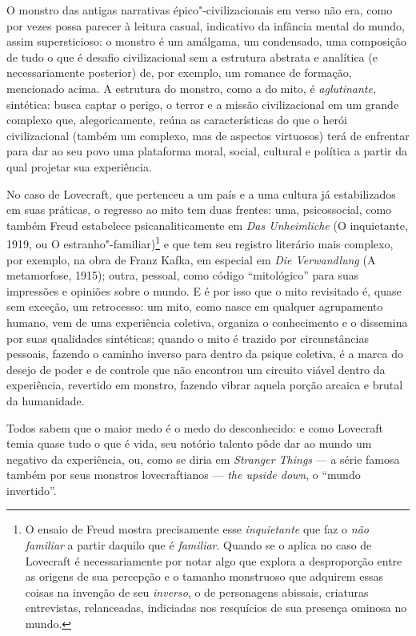 O monstro das antigas narrativas épico"-civilizacionais em verso não era,
como por vezes possa parecer à leitura casual, indicativo da infância
mental do mundo, assim supersticioso: o monstro é um amálgama, um
condensado, uma composição de tudo o que é desafio civilizacional sem a
estrutura abstrata e analítica (e necessariamente posterior) de, por
exemplo, um romance de formação, mencionado acima. A estrutura do
monstro, como a do mito, é \emph{aglutinante,} sintética: busca captar o
perigo, o terror e a missão civilizacional em um grande complexo que,
alegoricamente, reúna as características do que o herói civilizacional
(também um complexo, mas de aspectos virtuosos) terá de enfrentar para
dar ao seu povo uma plataforma moral, social, cultural e política a
partir da qual projetar sua experiência.

No caso de Lovecraft, que pertenceu a um país e a uma cultura já
estabilizados em suas práticas, o regresso ao mito tem duas frentes:
uma, psicossocial, como também Freud estabelece psicanaliticamente em
\emph{Das Unheimliche} (O inquietante, 1919, ou O
estranho"-familiar)\footnote{O ensaio de Freud mostra precisamente esse
  \emph{inquietante} que faz o \emph{não familiar} a partir daquilo que
  é \emph{familiar}. Quando se o aplica no caso de Lovecraft é
  necessariamente por notar algo que explora a desproporção entre as
  origens de sua percepção e o tamanho monstruoso que adquirem essas
  coisas na invenção de seu \emph{inverso}, o de personagens abissais,
  criaturas entrevistas, relanceadas, indiciadas nos resquícios de sua
  presença ominosa no mundo.} e que tem seu registro literário mais
complexo, por exemplo, na obra de Franz Kafka, em especial em \emph{Die
Verwandlung} (A metamorfose, 1915); outra, pessoal, como código
``mitológico'' para suas impressões e opiniões sobre o mundo. E é por
isso que o mito revisitado é, quase sem exceção, um retrocesso: um mito,
como nasce em qualquer agrupamento humano, vem de uma experiência
coletiva, organiza o conhecimento e o dissemina por suas qualidades
sintéticas; quando o mito é trazido por circunstâncias pessoais, fazendo
o caminho inverso para dentro da psique coletiva, é a marca do desejo de
poder e de controle que não encontrou um circuito viável dentro da
experiência, revertido em monstro, fazendo vibrar aquela porção arcaica
e brutal da humanidade.

Todos sabem que o maior medo é o medo do desconhecido: e como Lovecraft
temia quase tudo o que é vida, seu notório talento pôde dar ao mundo um
negativo da experiência, ou, como se diria em \emph{Stranger Things} ---
a série famosa também por seus monstros lovecraftianos --- \emph{the
upside down}, o ``mundo invertido''.

